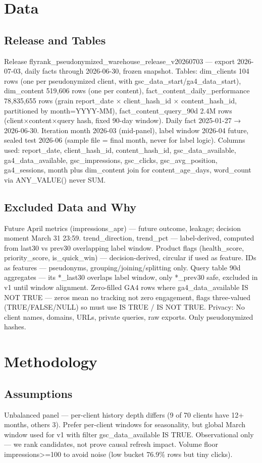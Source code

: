 \documentclass[conference]{IEEEtran}
\begin{document}
\section{Data}
\subsection{Release and Tables}
Release flyrank\_pseudonymized\_warehouse\_release\_v20260703 — export 2026-07-03, daily facts through 2026-06-30, frozen snapshot. Tables: dim\_clients 104 rows (one per pseudonymized client, with gsc\_data\_start/ga4\_data\_start), dim\_content 519,606 rows (one per content), fact\_content\_daily\_performance 78,835,655 rows (grain report\_date $\times$ client\_hash\_id $\times$ content\_hash\_id, partitioned by month=YYYY-MM), fact\_content\_query\_90d 2.4M rows (client×content×query hash, fixed 90-day window). Daily fact 2025-01-27 → 2026-06-30. Iteration month 2026-03 (mid-panel), label window 2026-04 future, sealed test 2026-06 (sample file = final month, never for label logic). Columns used: report\_date, client\_hash\_id, content\_hash\_id, gsc\_data\_available, ga4\_data\_available, gsc\_impressions, gsc\_clicks, gsc\_avg\_position, ga4\_sessions, month plus dim\_content join for content\_age\_days, word\_count via ANY\_VALUE() never SUM.

\subsection{Excluded Data and Why}
Future April metrics (impressions\_apr) — future outcome, leakage; decision moment March 31 23:59. trend\_direction, trend\_pct — label-derived, computed from last30 vs prev30 overlapping label window. Product flags (health\_score, priority\_score, is\_quick\_win) — decision-derived, circular if used as feature. IDs as features — pseudonyms, grouping/joining/splitting only. Query table 90d aggregates — its *\_last30 overlaps label window, only *\_prev30 safe, excluded in v1 until window alignment. Zero-filled GA4 rows where ga4\_data\_available IS NOT TRUE — zeros mean no tracking not zero engagement, flags three-valued (TRUE/FALSE/NULL) so must use IS TRUE / IS NOT TRUE. Privacy: No client names, domains, URLs, private queries, raw exports. Only pseudonymized hashes.

\section{Methodology}
\subsection{Assumptions}
Unbalanced panel — per-client history depth differs (9 of 70 clients have 12+ months, others 3). Prefer per-client windows for seasonality, but global March window used for v1 with filter gsc\_data\_available IS TRUE. Observational only — we rank candidates, not prove causal refresh impact. Volume floor impressions>=100 to avoid noise (low bucket 76.9\% rows but tiny clicks).
\end{document}
